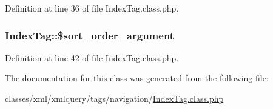 Definition at line 36 of file Index\-Tag.\-class.\-php.

\hypertarget{classIndexTag_af25bb5754a767188b72ee872e35414e6}{
\subsubsection[{\$sort\-\_\-order\-\_\-argument}]{\setlength{\rightskip}{0pt plus 5cm}Index\-Tag\-::\$sort\-\_\-order\-\_\-argument}}\label{classIndexTag_af25bb5754a767188b72ee872e35414e6}


Definition at line 42 of file Index\-Tag.\-class.\-php.



The documentation for this class was generated from the following file\-:\begin{DoxyCompactItemize}
\item 
classes/xml/xmlquery/tags/navigation/\hyperlink{IndexTag_8class_8php}{Index\-Tag.\-class.\-php}\end{DoxyCompactItemize}
